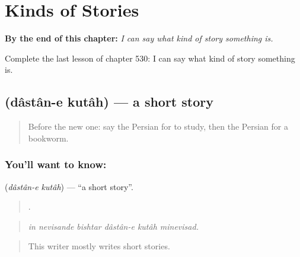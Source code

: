 
\chapter{Kinds of Stories}
\label{ch:fa-kinds-of-stories}

\begin{chapteropening}
\textbf{By the end of this chapter:} \emph{I can say what kind of story something is.}

Complete the last lesson of chapter 530: I can say what kind of story something is.
\end{chapteropening}

\section[\texorpdfstring{\fa{داستان} \fa{کوتاه} (dâstân-e kutâh)}{داستان کوتاه (dâstân-e kutâh)}]{  (dâstân-e kutâh) — a short story}

\label{lesson:FA-C530-dastan-e-kutah}



\begin{quote}
Before the new one: say the Persian for to study, then the Persian for a bookworm.
\end{quote}

\subsection*{You'll want to know:  }
\textbf{ } (\emph{dâstân-e kutâh}) — \textquotedblleft{}a short story\textquotedblright{}.

\begin{quote}
     .
\end{quote}

\begin{quote}
\emph{in nevisande bishtar dâstân-e kutâh minevisad.}
\end{quote}

\begin{quote}
This writer mostly writes short stories.
\end{quote}


